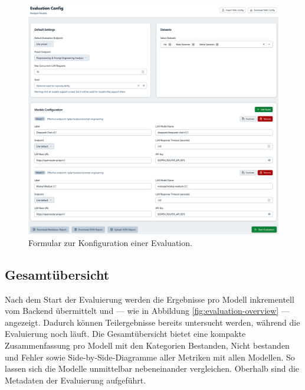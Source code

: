 \begin{figure}
    \centering
    \includegraphics[height=.55\textheight]{images/evaluation/evaluation-config}
    \caption{Formular zur Konfiguration einer Evaluation.}
    \label{fig:evaluation-config}
\end{figure}

\subsection*{Gesamtübersicht}

Nach dem Start der Evaluierung werden die Ergebnisse pro Modell inkrementell vom Backend übermittelt und — wie in Abbildung \ref{fig:evaluation-overview} — angezeigt. Dadurch können Teilergebnisse bereits untersucht werden, während die Evaluierung noch läuft. Die Gesamtübersicht bietet eine kompakte Zusammenfassung pro Modell mit den Kategorien Bestanden, Nicht bestanden und Fehler sowie Side-by-Side-Diagramme aller Metriken mit allen Modellen. So lassen sich die Modelle unmittelbar nebeneinander vergleichen. Oberhalb sind die Metadaten der Evaluierung aufgeführt.

